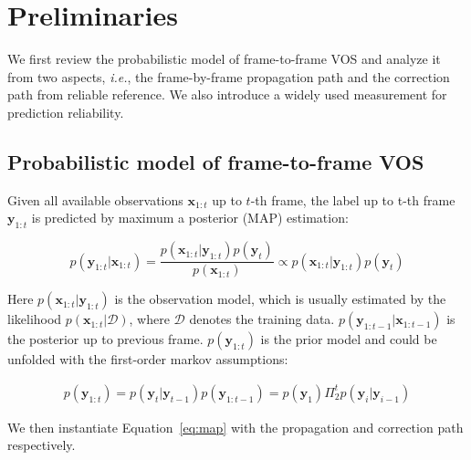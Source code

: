 \documentclass[letterpaper]{article} \usepackage{aaai22}  \usepackage{times}  \usepackage{helvet}  \usepackage{courier}  \usepackage[hyphens]{url}  \usepackage{graphicx} \urlstyle{rm} \def\UrlFont{\rm}  \usepackage{natbib}  \usepackage{caption} \DeclareCaptionStyle{ruled}{labelfont=normalfont,labelsep=colon,strut=off} \frenchspacing  \setlength{\pdfpagewidth}{8.5in}  \setlength{\pdfpageheight}{11in}  \usepackage{algorithm}
\def\ie{\textit{i.e.}}
\newcommand{\eqn}[1]{Equation~#1}
\begin{document}
\section{Preliminaries}
We first review the probabilistic model of frame-to-frame VOS and analyze it from two aspects, \ie, the frame-by-frame propagation path and the correction path from reliable reference. We also introduce a widely used measurement for prediction reliability.

\subsection{Probabilistic model of frame-to-frame VOS}
Given all available observations $\mathbf{x}_{1:t}$ up to $t$-th frame, the label up to t-th frame $\mathbf{y}_{1:t}$ is predicted by maximum a posterior (MAP) estimation:

\begin{small}
    \begin{equation}
    \label{eq:map}
    p(\mathbf{y}_{1:t} | \mathbf{x}_{1:t}) = \frac{p(\mathbf{x}_{1:t} | \mathbf{y}_{1:t}) p(\mathbf{y}_{t})}{p(\mathbf{x}_{1:t})} \propto p(\mathbf{x}_{1:t} | \mathbf{y}_{1:t}) p(\mathbf{y}_{t})
    \end{equation}
\end{small}

Here $p(\mathbf{x}_{1:t}|\mathbf{y}_{1:t})$ is the observation model, which is usually estimated by the likelihood $p(\mathbf{x}_{1:t}|\mathcal{D})$, where $\mathcal{D}$ denotes the training data. 
$p(\mathbf{y}_{1:t-1}|\mathbf{x}_{1:t-1})$ is the posterior up to previous frame.
$p(\mathbf{y}_{1:t})$ is the prior model and could be unfolded with the first-order markov assumptions:
\begin{small}
    \begin{eqnarray}
    \label{eq:prior}
        p(\mathbf{y}_{1:t}) = p(\mathbf{y}_{t} | \mathbf{y}_{t-1}) p(\mathbf{y}_{1:t-1})
        = p(\mathbf{y}_{1}) \Pi_{2}^t p(\mathbf{y}_{i} | \mathbf{y}_{i-1})
    \end{eqnarray}
\end{small}
We then instantiate \eqn{\ref{eq:map}} with the propagation and correction path respectively.
\end{document}
